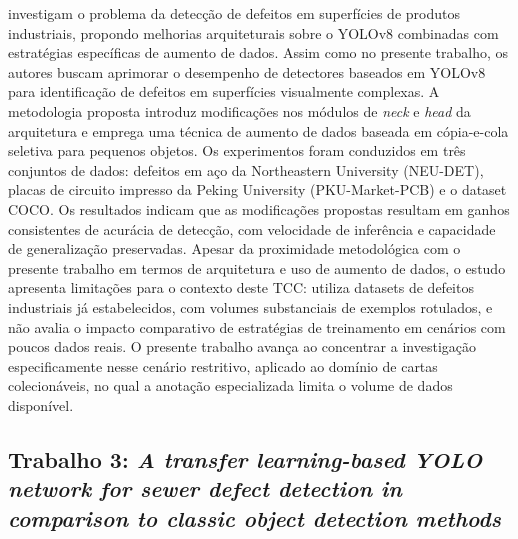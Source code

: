 \documentclass[
    12pt,                %
    openright,           %
    oneside,             %
    a4paper,             %
    english,             %
    brazil               %
]{abntex2}
\begin{document}
 investigam o problema da detecção de defeitos 
em superfícies de produtos industriais, propondo melhorias arquiteturais 
sobre o YOLOv8 combinadas com estratégias específicas de aumento de 
dados. Assim como no presente trabalho, os autores buscam aprimorar 
o desempenho de detectores baseados em YOLOv8 para identificação de 
defeitos em superfícies visualmente complexas. A metodologia proposta 
introduz modificações nos módulos de \textit{neck} e \textit{head} da 
arquitetura e emprega uma técnica de aumento de dados baseada em 
cópia-e-cola seletiva para pequenos objetos. Os experimentos foram 
conduzidos em três conjuntos de dados: defeitos em aço da Northeastern 
University (NEU-DET), placas de circuito impresso da Peking University 
(PKU-Market-PCB) e o dataset COCO. Os resultados indicam que as 
modificações propostas resultam em ganhos consistentes de acurácia de 
detecção, com velocidade de inferência e capacidade de generalização 
preservadas. Apesar da proximidade metodológica com o presente trabalho 
em termos de arquitetura e uso de aumento de dados, o estudo apresenta 
limitações para o contexto deste TCC: utiliza datasets de defeitos 
industriais já estabelecidos, com volumes substanciais de exemplos 
rotulados, e não avalia o impacto comparativo de estratégias de 
treinamento em cenários com poucos dados reais. O presente trabalho 
avança ao concentrar a investigação especificamente nesse cenário 
restritivo, aplicado ao domínio de cartas colecionáveis, no qual a 
anotação especializada limita o volume de dados disponível.

\subsection{Trabalho 3: \textit{A transfer learning-based YOLO network for sewer defect detection in comparison to classic object detection methods}}
\end{document}

